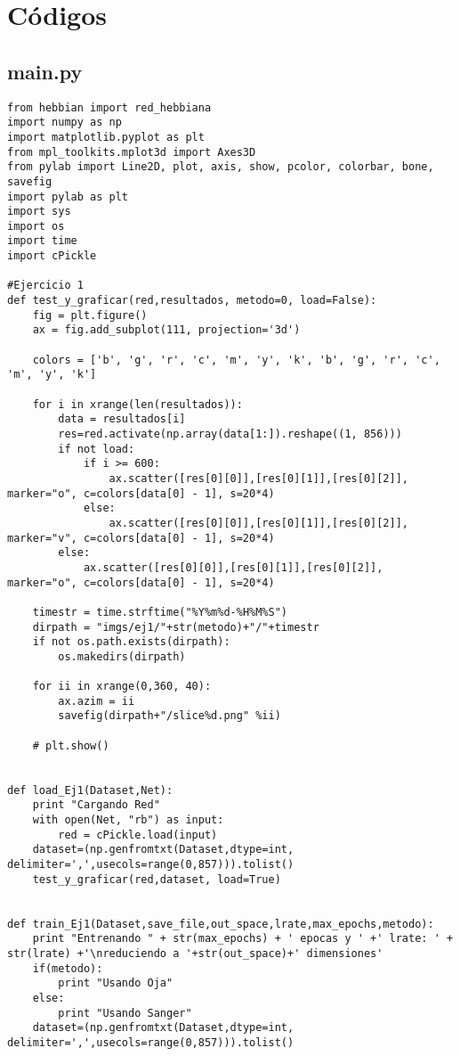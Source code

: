 \section{Códigos}

\subsection{main.py}
\begin{lstlisting}[caption=main.py]
from hebbian import red_hebbiana
import numpy as np
import matplotlib.pyplot as plt
from mpl_toolkits.mplot3d import Axes3D
from pylab import Line2D, plot, axis, show, pcolor, colorbar, bone, savefig
import pylab as plt
import sys
import os
import time
import cPickle

#Ejercicio 1
def test_y_graficar(red,resultados, metodo=0, load=False):
	fig = plt.figure()
	ax = fig.add_subplot(111, projection='3d')

	colors = ['b', 'g', 'r', 'c', 'm', 'y', 'k', 'b', 'g', 'r', 'c', 'm', 'y', 'k']
	
	for i in xrange(len(resultados)):
		data = resultados[i]
		res=red.activate(np.array(data[1:]).reshape((1, 856)))
		if not load:
			if i >= 600:
				ax.scatter([res[0][0]],[res[0][1]],[res[0][2]], marker="o", c=colors[data[0] - 1], s=20*4)
			else:
				ax.scatter([res[0][0]],[res[0][1]],[res[0][2]], marker="v", c=colors[data[0] - 1], s=20*4)
		else:
			ax.scatter([res[0][0]],[res[0][1]],[res[0][2]], marker="o", c=colors[data[0] - 1], s=20*4)
			
	timestr = time.strftime("%Y%m%d-%H%M%S")
	dirpath = "imgs/ej1/"+str(metodo)+"/"+timestr
	if not os.path.exists(dirpath):
		os.makedirs(dirpath)
	
	for ii in xrange(0,360, 40):
		ax.azim = ii 		
		savefig(dirpath+"/slice%d.png" %ii)

	# plt.show()


def load_Ej1(Dataset,Net):
	print "Cargando Red"
	with open(Net, "rb") as input:
		red = cPickle.load(input)
	dataset=(np.genfromtxt(Dataset,dtype=int, delimiter=',',usecols=range(0,857))).tolist()
	test_y_graficar(red,dataset, load=True)


def train_Ej1(Dataset,save_file,out_space,lrate,max_epochs,metodo):
	print "Entrenando " + str(max_epochs) + ' epocas y ' +' lrate: ' + str(lrate) +'\nreduciendo a '+str(out_space)+' dimensiones'
	if(metodo):
		print "Usando Oja"
	else:
		print "Usando Sanger"
	dataset=(np.genfromtxt(Dataset,dtype=int, delimiter=',',usecols=range(0,857))).tolist()


\end{lstlisting}
